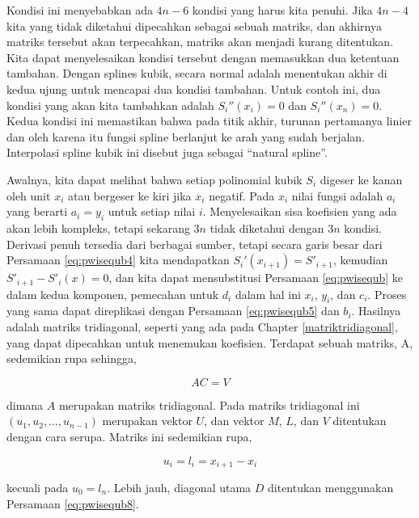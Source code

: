 \documentclass[
]{book}
\theoremstyle{definition}
\theoremstyle{definition}
\theoremstyle{definition}
\theoremstyle{definition}
\theoremstyle{remark}
\begin{document}
Kondisi ini menyebabkan ada \(4n − 6\) kondisi yang harus kita penuhi. Jika \(4n − 4\) kita yang tidak diketahui dipecahkan sebagai sebuah matriks, dan akhirnya matriks tersebut akan terpecahkan, matriks akan menjadi kurang ditentukan. Kita dapat menyelesaikan kondisi tersebut dengan memasukkan dua ketentuan tambahan. Dengan splines kubik, secara normal adalah menentukan akhir di kedua ujung untuk mencapai dua kondisi tambahan. Untuk contoh ini, dua kondisi yang akan kita tambahkan adalah \(S_i''\left(x_{i}\right)= 0\) dan \(S_i''\left(x_{n}\right)= 0\). Kedua kondisi ini memastikan bahwa pada titik akhir, turunan pertamanya linier dan oleh karena itu fungsi spline berlanjut ke arah yang sudah berjalan. Interpolasi spline kubik ini disebut juga sebagai ``natural spline''.

Awalnya, kita dapat melihat bahwa setiap polinomial kubik \(S_i\) digeser ke kanan oleh unit \(x_i\) atau bergeser ke kiri jika \(x_i\) negatif. Pada \(x_i\) nilai fungsi adalah \(a_i\) yang berarti \(a_i = y_i\) untuk setiap nilai \(i\). Menyelesaikan sisa koefisien yang ada akan lebih kompleks, tetapi sekarang \(3n\) tidak diketahui dengan \(3n\) kondisi. Derivasi penuh tersedia dari berbagai sumber, tetapi secara garis besar dari Persamaan \eqref{eq:pwisequb4} kita mendapatkan \(S_i'\left(x_{i+1}\right)=S'_{i+1}\), kemudian \(S'_{i + 1} - S'_i \left(x\right) = 0\), dan kita dapat mensubstitusi Persamaan \eqref{eq:pwisequb} ke dalam kedua komponen, pemecahan untuk \(d_i\) dalam hal ini \(x_i\), \(y_i\), dan \(c_i\). Proses yang sama dapat direplikasi dengan Persamaan \eqref{eq:pwisequb5} dan \(b_i\). Hasilnya adalah matriks tridiagonal, seperti yang ada pada Chapter \ref{matriktridiagonal}, yang dapat dipecahkan untuk menemukan koefisien. Terdapat sebuah matriks, A, sedemikian rupa sehingga,

\begin{equation}
AC=V
  \label{eq:pwisequb6}
\end{equation}

dimana \(A\) merupakan matriks tridiagonal. Pada matriks tridiagonal ini \(\left(u_1,u_2,\dots,u_{n-1}\right)\) merupakan vektor \(U\), dan vektor \(M\), \(L\), dan \(V\) ditentukan dengan cara serupa. Matriks ini sedemikian rupa,

\begin{equation}
u_i=l_i=x_{i+1}-x_i
  \label{eq:pwisequb7}
\end{equation}

kecuali pada \(u_0=l_n\). Lebih jauh, diagonal utama \(D\) ditentukan menggunakan Persamaan \eqref{eq:pwisequb8}.
\end{document}
